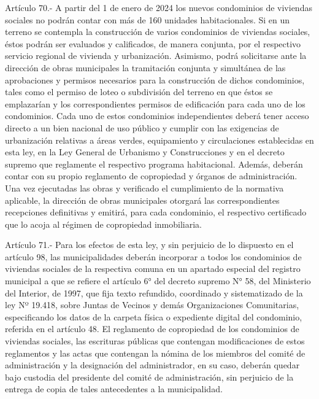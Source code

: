     Artículo 70.- A partir del 1 de enero de 2024 los nuevos condominios de viviendas sociales no podrán contar con más de 160 unidades habitacionales.
    Si en un terreno se contempla la construcción de varios condominios de viviendas sociales, éstos podrán ser evaluados y calificados, de manera conjunta, por el respectivo servicio regional de vivienda y urbanización.
    Asimismo, podrá solicitarse ante la dirección de obras municipales la tramitación conjunta y simultánea de las aprobaciones y permisos necesarios para la construcción de dichos condominios, tales como el permiso de loteo o subdivisión del terreno en que éstos se emplazarían y los correspondientes permisos de edificación para cada uno de los condominios.
    Cada uno de estos condominios independientes deberá tener acceso directo a un bien nacional de uso público y cumplir con las exigencias de urbanización relativas a áreas verdes, equipamiento y circulaciones establecidas en esta ley, en la Ley General de Urbanismo y Construcciones y en el decreto supremo que reglamente el respectivo programa habitacional. Además, deberán contar con su propio reglamento de copropiedad y órganos de administración. Una vez ejecutadas las obras y verificado el cumplimiento de la normativa aplicable, la dirección de obras municipales otorgará las correspondientes recepciones definitivas y emitirá, para cada condominio, el respectivo certificado que lo acoja al régimen de copropiedad inmobiliaria.

     
    Artículo 71.- Para los efectos de esta ley, y sin perjuicio de lo dispuesto en el artículo 98, las municipalidades deberán incorporar a todos los condominios de viviendas sociales de la respectiva comuna en un apartado especial del registro municipal a que se refiere el artículo 6° del decreto supremo N° 58, del Ministerio del Interior, de 1997, que fija texto refundido, coordinado y sistematizado de la ley Nº 19.418, sobre Juntas de Vecinos y demás Organizaciones Comunitarias, especificando los datos de la carpeta física o expediente digital del condominio, referida en el artículo 48.
    El reglamento de copropiedad de los condominios de viviendas sociales, las escrituras públicas que contengan modificaciones de estos reglamentos y las actas que contengan la nómina de los miembros del comité de administración y la designación del administrador, en su caso, deberán quedar bajo custodia del presidente del comité de administración, sin perjuicio de la entrega de copia de tales antecedentes a la municipalidad.
     
